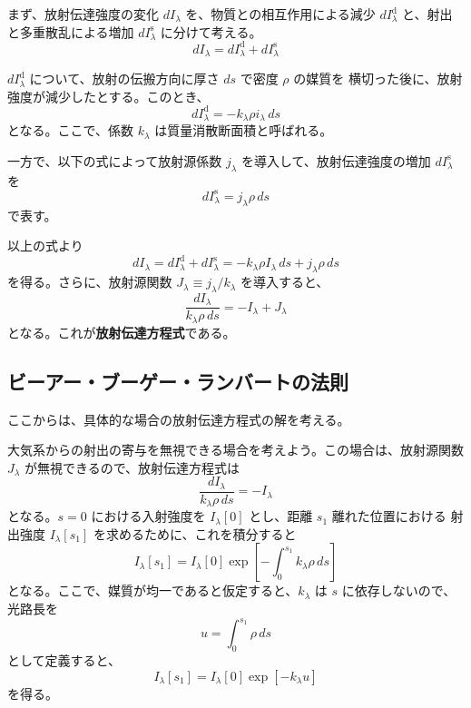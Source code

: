 \documentclass[article,twoside]{dennou777}
\newcommand{\hmemph}[1]{\textbf{#1}}
\begin{document}
まず、放射伝達強度の変化 $dI_\lambda$ を、物質との相互作用による減少
$dI_\lambda^\mathrm{d}$ と、射出と多重散乱による増加 $dI_\lambda^\mathrm{s}$ に分けて考える。
\begin{equation}
	dI_\lambda=dI_\lambda^\mathrm{d}+dI_\lambda^\mathrm{s}
\end{equation}

$dI_\lambda^\mathrm{d}$ について、放射の伝搬方向に厚さ $ds$ で密度 $\rho$ の媒質を
横切った後に、放射強度が減少したとする。このとき、
\begin{equation}
	dI_\lambda^\mathrm{d}=-k_\lambda\rho i_\lambda\,ds
\end{equation}
となる。ここで、係数 $k_\lambda$ は質量消散断面積と呼ばれる。

一方で、以下の式によって放射源係数 $j_\lambda$ を導入して、放射伝達強度の増加
$dI_\lambda^\mathrm{s}$ を
\begin{equation}
	dI_\lambda^\mathrm{s}=j_\lambda\rho\,ds
\end{equation}
で表す。

以上の式より
\begin{equation}
	dI_\lambda=dI_\lambda^\mathrm{d}+dI_\lambda^\mathrm{s}
	=-k_\lambda\rho I_\lambda\,ds+j_\lambda\rho\,ds
\end{equation}
を得る。さらに、放射源関数 $J_\lambda\equiv j_\lambda/k_\lambda$ を導入すると、
\begin{equation}
	\frac{dI_\lambda}{k_\lambda\rho\,ds}=-I_\lambda+J_\lambda
\end{equation}
となる。これが\hmemph{放射伝達方程式}である。

\subsection{ビーアー・ブーゲー・ランバートの法則}
ここからは、具体的な場合の放射伝達方程式の解を考える。

大気系からの射出の寄与を無視できる場合を考えよう。この場合は、放射源関数 $J_\lambda$
が無視できるので、放射伝達方程式は
\begin{equation}
	\frac{dI_\lambda}{k_\lambda\rho\,ds}=-I_\lambda
\end{equation}
となる。$s=0$ における入射強度を $I_\lambda[0]$ とし、距離 $s_1$ 離れた位置における
射出強度 $I_\lambda[s_1]$ を求めるために、これを積分すると
\begin{equation}
	I_\lambda[s_1]=I_\lambda[0]\exp[-\int^{s_1}_0 k_\lambda\rho\,ds]
\end{equation}
となる。ここで、媒質が均一であると仮定すると、$k_\lambda$ は $s$ に依存しないので、光路長を
\begin{equation}
	u=\int^{s_1}_0\rho\,ds
\end{equation}
として定義すると、
\begin{equation}
	I_\lambda[s_1]=I_\lambda[0]\exp[-k_\lambda u]
\end{equation}
を得る。
\end{document}
